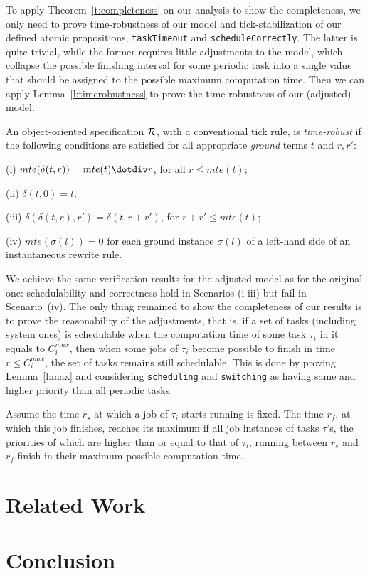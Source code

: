 \documentclass{llncs}
\begin{document}
To apply Theorem~\ref{t:completeness} on our analysis to show the
completeness, we only need to prove time-robustness of our model and
tick-stabilization of our defined atomic propositions,
\verb|taskTimeout| and \verb|scheduleCorrectly|. The latter is quite
trivial, while the former requires little adjustments to the model,
which collapse the possible finishing interval for some periodic task
into a single value that should be assigned to the possible maximum
computation time. Then we can apply Lemma~\ref{l:timerobustness} to
prove the time-robustness of our (adjusted) model.
\begin{lemma}
\label{l:timerobustness}
An object-oriented specification $\cal R$, with a conventional tick
rule, is \emph{time-robust} if the following conditions are satisfied
for all appropriate \emph{ground} terms $t$ and $r,r'$:

\noindent
(i) $mte(\delta(t,r))=mte(t)\dotdiv r$, for all $r\le mte(t)$;

\noindent
(ii) $\delta(t,0)=t$;

\noindent
(iii) $\delta(\delta(t,r),r')=\delta(t,r+r')$, for $r+r'\le mte(t)$;

\noindent
(iv) $mte(\sigma(l))=0$ for each ground instance $\sigma(l)$ of a
left-hand side of an instantaneous rewrite rule.
\end{lemma}

We achieve the same verification results for the adjusted model as for
the original one: schedulability and correctness hold in Scenarios
(i-iii) but fail in Scenario~(iv). The only thing remained to show the
completeness of our results is to prove the reasonability of the
adjustments, that is, if a set of tasks (including system ones) is
schedulable when the computation time of some task $\tau_i$ in it
equals to $C_i^{max}$, then when some jobs of $\tau_i$ become possible
to finish in time $r\le C_i^{max}$, the set of tasks remains still
schedulable. This is done by proving Lemma~\ref{l:max} and considering
\verb|scheduling| and \verb|switching| as having same and higher
priority than all periodic tasks.
\begin{lemma}
\label{l:max}
Assume the time $r_s$ at which a job of $\tau_i$ starts running is
fixed. The time $r_f$, at which this job finishes, reaches its maximum
if all job instances of tasks $\tau$'s, the priorities of which are
higher than or equal to that of $\tau_i$, running between $r_s$ and
$r_f$ finish in their maximum possible computation time.
\end{lemma}


\section{Related Work}

\section{Conclusion}
\end{document}
